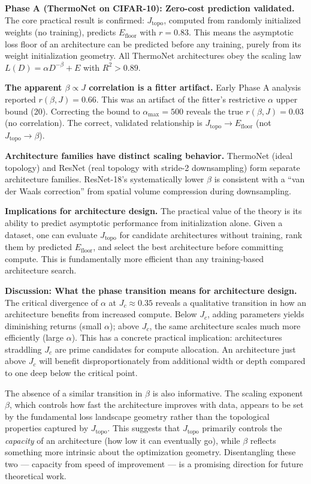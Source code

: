 \documentclass[11pt, a4paper]{article}
\theoremstyle{definition}
\begin{document}
\textbf{Phase A (ThermoNet on CIFAR-10): Zero-cost prediction validated.} The core practical result is confirmed: $J_\mathrm{topo}$, computed from randomly initialized weights (no training), predicts $E_\mathrm{floor}$ with $r = 0.83$. This means the asymptotic loss floor of an architecture can be predicted before any training, purely from its weight initialization geometry. All ThermoNet architectures obey the scaling law $L(D) = \alpha D^{-\beta} + E$ with $R^2 > 0.89$.

\textbf{The apparent $\beta \propto J$ correlation is a fitter artifact.} Early Phase A analysis reported $r(\beta, J) = 0.66$. This was an artifact of the fitter's restrictive $\alpha$ upper bound (20). Correcting the bound to $\alpha_\max = 500$ reveals the true $r(\beta, J) = 0.03$ (no correlation). The correct, validated relationship is $J_\mathrm{topo} \to E_\mathrm{floor}$ (not $J_\mathrm{topo} \to \beta$).

\textbf{Architecture families have distinct scaling behavior.} ThermoNet (ideal topology) and ResNet (real topology with stride-2 downsampling) form separate architecture families. ResNet-18's systematically lower $\beta$ is consistent with a ``van der Waals correction'' from spatial volume compression during downsampling.

\textbf{Implications for architecture design.} The practical value of the theory is its ability to predict asymptotic performance from initialization alone. Given a dataset, one can evaluate $J_\mathrm{topo}$ for candidate architectures without training, rank them by predicted $E_\mathrm{floor}$, and select the best architecture before committing compute. This is fundamentally more efficient than any training-based architecture search.


\textbf{Discussion: What the phase transition means for architecture design.} The critical divergence of $\alpha$ at $J_c \approx 0.35$ reveals a qualitative transition in how an architecture benefits from increased compute. Below $J_c$, adding parameters yields diminishing returns (small $\alpha$); above $J_c$, the same architecture scales much more efficiently (large $\alpha$). This has a concrete practical implication: architectures straddling $J_c$ are prime candidates for compute allocation. An architecture just above $J_c$ will benefit disproportionately from additional width or depth compared to one deep below the critical point.

The absence of a similar transition in $\beta$ is also informative. The scaling exponent $\beta$, which controls how fast the architecture improves with data, appears to be set by the fundamental loss landscape geometry rather than the topological properties captured by $J_\mathrm{topo}$. This suggests that $J_\mathrm{topo}$ primarily controls the \emph{capacity} of an architecture (how low it can eventually go), while $\beta$ reflects something more intrinsic about the optimization geometry. Disentangling these two — capacity from speed of improvement — is a promising direction for future theoretical work.
\end{document}
